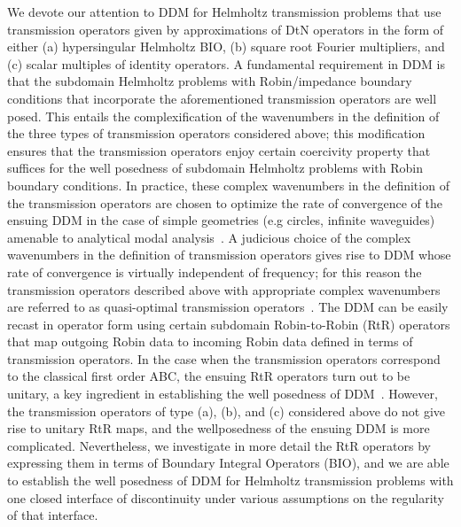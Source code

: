 \documentclass[11pt]{article}
\numberwithin{equation}{section}
\begin{document}
We devote our attention to DDM for Helmholtz transmission problems that use transmission operators given by approximations of DtN operators in the form of either (a) hypersingular Helmholtz BIO, (b) square root Fourier multipliers, and (c) scalar multiples of identity operators. A fundamental requirement in DDM is that the subdomain Helmholtz problems with Robin/impedance boundary conditions that incorporate the aforementioned transmission operators are well posed. This entails the complexification of the wavenumbers in the definition of the three types of transmission operators considered above; this modification ensures that the transmission operators enjoy certain coercivity property that suffices for the well posedness of subdomain Helmholtz problems with Robin boundary conditions. In practice, these complex wavenumbers in the definition of the transmission operators are chosen to optimize the rate of convergence of the ensuing DDM in the case of simple geometries (e.g circles, infinite waveguides) amenable to analytical modal analysis~\cite{boubendirDDM}. A judicious choice of the complex wavenumbers in the definition of transmission operators gives rise to DDM whose rate of convergence is virtually independent of frequency; for this reason the transmission operators described above with appropriate complex wavenumbers are referred to as quasi-optimal transmission operators~\cite{boubendirDDM}. The DDM can be easily recast in operator form using certain subdomain Robin-to-Robin (RtR) operators that map outgoing Robin data to incoming Robin data defined in terms of transmission operators. In the case when the transmission operators correspond to the classical first order ABC, the ensuing RtR operators turn out to be unitary, a key ingredient in establishing the well posedness of DDM~\cite{Depres,Collino1}. However, the transmission operators of type (a), (b), and (c) considered above do not give rise to unitary RtR maps, and the wellposedness of the ensuing DDM is more complicated. Nevertheless, we investigate in more detail the  RtR operators by expressing them in terms of Boundary Integral Operators (BIO), and we are able to establish the well posedness of DDM for Helmholtz transmission problems with one closed interface of discontinuity under various assumptions on the regularity of that interface. 
\end{document}
